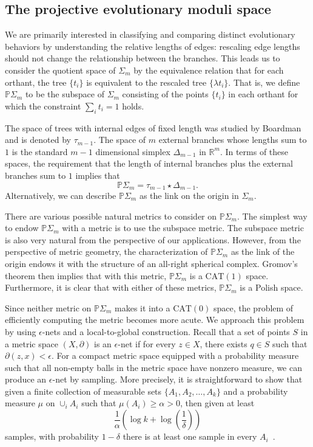 \documentclass[a4paper,11pt]{article}
\newcommand{\CAT}{\textrm{CAT}}
\begin{document}
\subsection{The projective evolutionary moduli space}

We are primarily interested in classifying and comparing distinct evolutionary behaviors by understanding the relative lengths of edges: rescaling edge lengths should not change the relationship between the branches.
This leads us to consider the quotient space of $\Sigma_m$ by the equivalence relation that for each orthant, the tree $\{t_i\}$ is equivalent to the rescaled tree $\{\lambda t_i\}$.
That is, we define $\mathbb{P} \Sigma_m$ to be the subspace of $\Sigma_m$ consisting of the points $\{t_i\}$ in each orthant for which the constraint $\sum_{i} t_i = 1$ holds.

The space of trees with internal edges of fixed length was studied by Boardman and is denoted by $\tau_{m-1}$.
The space of $m$ external branches whose lengths sum to $1$ is the standard $m-1$ dimensional simplex $\Delta_{m-1}$ in $\mathbb{R}^m$.
In terms of these spaces, the requirement that the length of internal branches plus the external branches sum to $1$ implies that
\[\mathbb{P}\Sigma_m = \tau_{m-1} \star \Delta_{m-1}.\] 
Alternatively, we can describe $\mathbb{P}\Sigma_m$ as the link on the origin in $\Sigma_m$.

There are various possible natural metrics to consider on $\mathbb{P} \Sigma_m$.
The simplest way to endow $\mathbb{P} \Sigma_m$ with a metric is to use the subspace metric.
The subspace metric is also very natural from the perspective of our applications.
However, from the perspective of metric geometry, the characterization of $\mathbb{P} \Sigma_m$ as the link of the origin endows it with the structure of an all-right spherical complex.
Gromov's theorem then implies that with this metric, $\mathbb{P} \Sigma_m$ is a $\CAT(1)$ space.
Furthermore, it is clear that with either of these metrics, $\mathbb{P} \Sigma_m$ is a Polish space.

Since neither metric on $\mathbb{P} \Sigma_m$ makes it into a $\CAT(0)$ space, the problem of efficiently computing the metric becomes more acute.
We approach this problem by using $\epsilon$-nets and a local-to-global construction.
Recall that a set of points $S$ in a metric space $(X,\partial)$ is an $\epsilon$-net if for every $z \in X$, there exists $q \in S$ such that $\partial(z,x) < \epsilon$.
For a compact metric space equipped with a probability measure such that all non-empty balls in the metric space have nonzero measure, we can produce an $\epsilon$-net by sampling.
More precisely, it is straightforward to show that given a finite collection of measurable sets $\{A_1, A_2, \ldots, A_k\}$ and a probability measure $\mu$ on $\cup_i A_i$ such that $\mu(A_i) \geq \alpha > 0$, then given at least 
\[
\frac{1}{\alpha}\left(\log k + \log(\frac{1}{\delta})\right)
\]
samples, with probability $1-\delta$ there is at least one sample in every $A_i$~\cite[5.1]{niyogi2008finding}.
\end{document}
